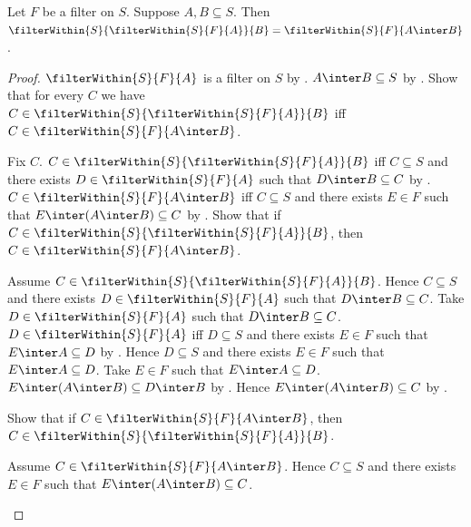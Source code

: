 \begin{theorem}\label{filter_within_intersection}
    Let $F$ be a filter on $S$.
    Suppose $A,B\subseteq S$.
    Then $\filterWithin{S}{\filterWithin{S}{F}{A}}{B}
        =\filterWithin{S}{F}{A\inter B}$.
\end{theorem}
\begin{proof}
    $\filterWithin{S}{F}{A}$ is a filter on $S$ by
        .
    $A\inter B\subseteq S$ by .
    Show that for every $C$ we have
        $C\in\filterWithin{S}{\filterWithin{S}{F}{A}}{B}$ iff
        $C\in\filterWithin{S}{F}{A\inter B}$.
    \begin{subproof}
        Fix $C$.
        $C\in\filterWithin{S}{\filterWithin{S}{F}{A}}{B}$ iff
            $C\subseteq S$ and there exists
            $D\in\filterWithin{S}{F}{A}$ such that
            $D\inter B\subseteq C$ by .
        $C\in\filterWithin{S}{F}{A\inter B}$ iff
            $C\subseteq S$ and there exists $E\in F$ such that
            $E\inter(A\inter B)\subseteq C$ by .
        Show that if
            $C\in\filterWithin{S}{\filterWithin{S}{F}{A}}{B}$, then
            $C\in\filterWithin{S}{F}{A\inter B}$.
        \begin{subproof}
            Assume $C\in\filterWithin{S}{\filterWithin{S}{F}{A}}{B}$.
            Hence $C\subseteq S$ and there exists
                $D\in\filterWithin{S}{F}{A}$ such that
                $D\inter B\subseteq C$.
            Take $D\in\filterWithin{S}{F}{A}$ such that
                $D\inter B\subseteq C$.
            $D\in\filterWithin{S}{F}{A}$ iff
                $D\subseteq S$ and there exists $E\in F$ such that
                $E\inter A\subseteq D$ by .
            Hence $D\subseteq S$ and there exists $E\in F$ such that
                $E\inter A\subseteq D$.
            Take $E\in F$ such that $E\inter A\subseteq D$.
            $E\inter(A\inter B)\subseteq D\inter B$ by
                .
            Hence $E\inter(A\inter B)\subseteq C$ by
                .
        \end{subproof}
        Show that if $C\in\filterWithin{S}{F}{A\inter B}$, then
            $C\in\filterWithin{S}{\filterWithin{S}{F}{A}}{B}$.
        \begin{subproof}
            Assume $C\in\filterWithin{S}{F}{A\inter B}$.
            Hence $C\subseteq S$ and there exists $E\in F$ such that
                $E\inter(A\inter B)\subseteq C$.

\end{subproof}
\end{subproof}
\end{proof}
